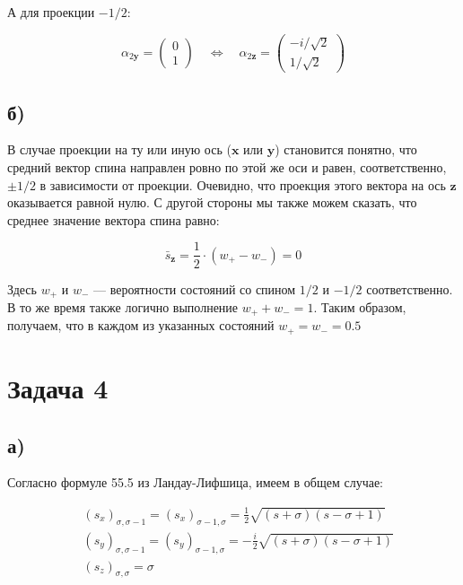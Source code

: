 \documentclass[a4paper, 12pt]{article}
\newcommand{\qlrq}
{\ensuremath{\quad \Leftrightarrow \quad}} %
\begin{document}
А для проекции $-1/2$:

\begin{equation}
	\alpha_{2\mathbf{y}} = 
	\begin{pmatrix}
	0\\
	1
	\end{pmatrix}
	\qlrq \boxed{\alpha_{2\mathbf{z}} = 
	\begin{pmatrix}
	-i / \sqrt{2}\\
	1 / \sqrt{2}
	\end{pmatrix}}
\end{equation}

\subsection*{б)}

В случае проекции на ту или иную ось ($\mathbf{x}$ или $\mathbf{y}$) становится понятно, что средний вектор спина направлен ровно по этой же оси и равен, соответственно, $\pm 1/2$ в зависимости от проекции. Очевидно, что проекция этого вектора на ось $\mathbf{z}$ оказывается равной нулю. С другой стороны мы также можем сказать, что среднее значение вектора спина равно:

\begin{equation*}
	\bar{s}_{\mathbf{z}} = \frac{1}{2} \cdot (w_+ - w_-) = 0
\end{equation*}

Здесь $w_+$ и $w_-$ --- вероятности состояний со спином $1/2$ и $-1/2$ соответственно. В то же время также логично выполнение $w_+ + w_- = 1$. Таким образом, получаем, что в каждом из указанных состояний $\boxed{w_+ = w_- = 0.5}$ 

\section*{Задача 4}

\subsection*{а)}

Согласно формуле 55.5 из Ландау-Лифшица, имеем в общем случае:

\begin{align*}
	&(s_x)_{\sigma,\sigma-1} = (s_x)_{\sigma-1,\sigma} = \frac{1}{2} \sqrt{(s + \sigma)(s - \sigma + 1)}\\
	&(s_y)_{\sigma, \sigma-1} = (s_y)_{\sigma - 1, \sigma} = -\frac{i}{2}\sqrt{(s + \sigma) (s - \sigma + 1)}\\
	&(s_z)_{\sigma, \sigma} = \sigma
\end{align*}
\end{document}

